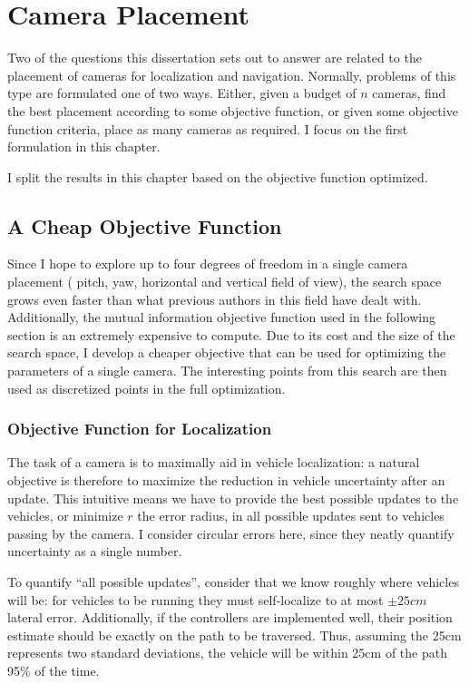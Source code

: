 \documentclass[a4paper,12pt,twoside,openright]{report}
\begin{document}
\chapter{Camera Placement}
\label{chap:cameraplacement}

Two of the questions this dissertation sets out to answer
are related to the placement of cameras for localization and navigation.
Normally, problems of this type are formulated one of two ways. Either,
given a budget of $n$ cameras, find the best placement according to
some objective function, or given some objective function criteria,
place as many cameras as required. I focus on the first formulation
in this chapter.

I split the results in this chapter based on the objective
function optimized.

\section{A Cheap Objective Function}
\label{cameraplacement:cheap}

Since I hope to explore up to four degrees of freedom in a single camera placement (
pitch, yaw, horizontal and vertical field of view), the search space grows even
faster than what previous authors in this field have dealt with. Additionally,
the mutual information objective function used in the following section is an extremely expensive to compute.
Due to its cost and the size of the search space, I develop a cheaper objective that can be used for optimizing
the parameters of a single camera. The interesting points from this search are then used
as discretized points in the full optimization.


\subsection{Objective Function for Localization}

The task of a camera is to maximally aid in vehicle localization: a natural
objective is therefore to maximize the reduction in vehicle uncertainty
after an update. This intuitive means we have to provide the best possible
updates to the vehicles, or minimize $r$ the error radius, in all possible updates sent to vehicles
passing by the camera. I consider circular errors here,
since they neatly quantify uncertainty as a single number.

To quantify ``all possible updates'', consider that we know roughly where vehicles will be: 
for vehicles to be running they must self-localize to at most $\pm25cm$ lateral error. 
Additionally, if the controllers are implemented well, their position estimate should be exactly on the path
to be traversed. Thus, assuming the 25cm represents two standard deviations,
the vehicle will be within 25cm of the path 95\% of the time.
\end{document}
